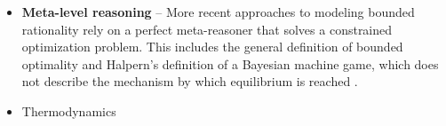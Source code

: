 \begin{itemize}
    \item \textbf{Meta-level reasoning} -- More recent approaches to modeling bounded rationality rely on a perfect meta-reasoner that solves a constrained optimization problem. This includes the general definition of bounded optimality \cite{bounded_optimality_RS, bounded_optimality_LHS, bounded_optimality_zilberstein} and Halpern's definition of a Bayesian machine game, which does not describe the mechanism by which equilibrium is reached \cite{halpern_choice, halpern_game}.
    
    \item Thermodynamics \cite{thermo_info, thermo_thermo, thermo_main}
    
\end{itemize}
